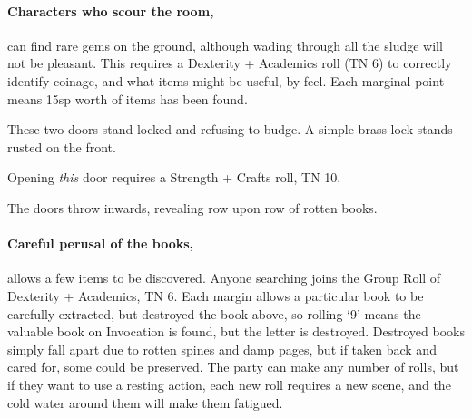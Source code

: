 \begin{multicols}{2}
\begin{boxtext}
\end{boxtext}



\paragraph{Characters who scour the room,}
can find rare gems on the ground, although wading through all the sludge will not be pleasant.
This requires a Dexterity + Academics roll (TN 6) to correctly identify coinage, and what items might be useful, by feel.
Each marginal point means 15sp worth of items has been found.


\begin{boxtext}

  These two doors stand locked and refusing to budge.  A simple brass lock stands rusted on the front.

\end{boxtext}

Opening \emph{this} door requires a Strength + Crafts roll, TN 10.

\begin{boxtext}
  The doors throw inwards, revealing row upon row of rotten books.
\end{boxtext}

\paragraph{Careful perusal of the books,}
allows a few items to be discovered.
Anyone searching joins the Group Roll of Dexterity + Academics, TN 6.
Each margin allows a particular book to be carefully extracted, but destroyed the book above, so rolling `9' means the valuable book on Invocation is found, but the letter is destroyed.
Destroyed books simply fall apart due to rotten spines and damp pages, but if taken back and cared for, some could be preserved.
The party can make any number of rolls, but if they want to use a resting action, each new roll requires a new scene, and the cold water around them will make them fatigued.

\begin{enumerate}


\end{enumerate}
\end{multicols}

